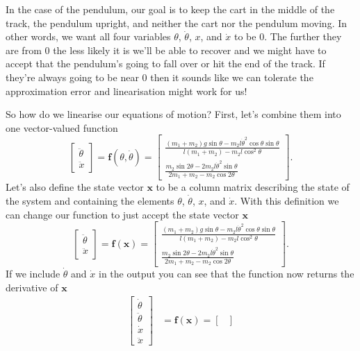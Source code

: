 \documentclass{article}
\renewcommand{\vec}[1]{\boldsymbol{\mathbf{#1}}}
\begin{document}
In the case of the pendulum, our goal is to keep the cart in the middle of the track, the pendulum upright, and neither the cart nor the pendulum moving. In other words, we want all four variables $\theta$, $\dot{\theta}$, $x$, and $\dot{x}$ to be $0$. The further they are from $0$ the less likely it is we'll be able to recover and we might have to accept that the pendulum's going to fall over or hit the end of the track. If they're always going to be near $0$ then it sounds like we can tolerate the approximation error and linearisation might work for us!

So how do we linearise our equations of motion? First, let's combine them into one vector-valued function \[\begin{bmatrix}
    \ddot{\theta} \\
    \ddot{x}
  \end{bmatrix} = \vec{f}(\theta, \dot{\theta}) = \begin{bmatrix}
    \frac{(m_1 + m_2) g \sin \theta - m_2 l \dot{\theta}^2 \cos \theta \sin \theta}{l (m_1 + m_2) - m_2 l \cos^2 \theta} \\
    \frac{m_2 \sin 2 \theta - 2 m_2 l \dot{\theta}^2 \sin \theta}{2 m_1 + m_2 - m_2 \cos 2 \theta}
\end{bmatrix}.\] Let's also define the state vector $\vec{x}$ to be a column matrix describing the state of the system and containing the elements $\theta$, $\dot{\theta}$, $x$, and $\dot{x}$. With this definition we can change our function to just accept the state vector $\vec{x}$ \[\begin{bmatrix}
    \ddot{\theta} \\
    \ddot{x}
  \end{bmatrix} = \vec{f}(\vec{x}) = \begin{bmatrix}
    \frac{(m_1 + m_2) g \sin \theta - m_2 l \dot{\theta}^2 \cos \theta \sin \theta}{l (m_1 + m_2) - m_2 l \cos^2 \theta} \\
    \frac{m_2 \sin 2 \theta - 2 m_2 l \dot{\theta}^2 \sin \theta}{2 m_1 + m_2 - m_2 \cos 2 \theta}
\end{bmatrix}.\] If we include $\dot{\theta}$ and $\dot{x}$ in the output you can see that the function now returns the derivative of $\vec{x}$ \begin{align*}
  \begin{bmatrix}
    \dot{\theta}  \\
    \ddot{\theta} \\
    \dot{x}       \\
    \ddot{x}
  \end{bmatrix} & = \vec{f}(\vec{x}) = \begin{bmatrix}

\end{bmatrix}
\end{align*}
\end{document}
